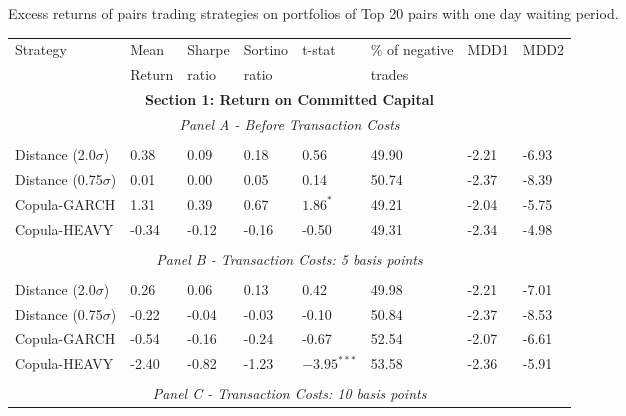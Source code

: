 \documentclass[a4paper,12pt]{report}
\begin{document}
\begin{refsection}
\begin{threeparttable}[H]
	\centering \scriptsize \singlespacing
	\caption{Excess returns of pairs trading strategies on portfolios of Top 20 pairs with one day waiting period.}
	\begin{tabularx}{\textwidth}{@{\extracolsep{\fill}}llllllll@{}}
		\toprule
		Strategy & Mean  & Sharpe & Sortino & t-stat & \% of negative   & MDD1 & MDD2 \\
		& Return & ratio &  ratio     &  &  trades     &       &  \\
		\midrule
		\multicolumn{8}{c}{\textbf{Section 1: Return on Committed Capital}} \\
		\multicolumn{8}{c}{\textit{Panel A - Before Transaction Costs}} \\
		&       &       &       &       &       &       &  \\
		Distance (2.0$\sigma$) & 0.38  & 0.09  & 0.18  & 0.56  & 49.90 & -2.21  & -6.93 \\
		Distance (0.75$\sigma$) & 0.01  & 0.00  & 0.05  & 0.14  & 50.74 & -2.37  & -8.39 \\
		Copula-GARCH & 1.31  & 0.39  & 0.67  & $1.86^{*}$  & 49.21 & -2.04  & -5.75 \\
		Copula-HEAVY & -0.34 & -0.12 & -0.16 & -0.50 & 49.31 & -2.34  & -4.98 \\
		\multicolumn{1}{r}{} & \multicolumn{1}{r}{} & \multicolumn{1}{r}{} & \multicolumn{1}{r}{} & \multicolumn{1}{r}{} & \multicolumn{1}{r}{} & \multicolumn{1}{r}{} & \multicolumn{1}{r}{} \\
		\multicolumn{8}{c}{\textit{Panel B - Transaction Costs: 5 basis points}} \\
		&       &       &       &       &       &       &  \\
		Distance (2.0$\sigma$) & 0.26  & 0.06  & 0.13  & 0.42  & 49.98 & -2.21  & -7.01 \\
		Distance (0.75$\sigma$) & -0.22 & -0.04 & -0.03 & -0.10 & 50.84 & -2.37  & -8.53 \\
		Copula-GARCH & -0.54 & -0.16 & -0.24 & -0.67 & 52.54 & -2.07  & -6.61 \\
		Copula-HEAVY & -2.40 & -0.82 & -1.23 & $-3.95^{***}$ & 53.58 & -2.36  & -5.91 \\
		\multicolumn{1}{r}{} & \multicolumn{1}{r}{} & \multicolumn{1}{r}{} & \multicolumn{1}{r}{} & \multicolumn{1}{r}{} & \multicolumn{1}{r}{} & \multicolumn{1}{r}{} & \multicolumn{1}{r}{} \\
		\multicolumn{8}{c}{\textit{Panel C - Transaction Costs: 10 basis points}} \\

\end{tabularx}
\end{threeparttable}
\end{refsection}
\end{document}
